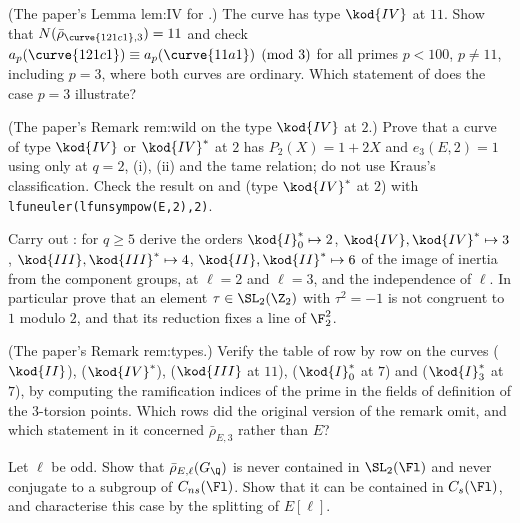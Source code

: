 \begin{exercise}\label{ex:galrep:121c1}
(The paper's Lemma lem:IV for .) The curve  has type $\kod{IV}$ at $11$. Show that $N(\bar\rho_{\curve{121c1},3})=11$ and check
$a_p(\curve{121c1})\equiv a_p(\curve{11a1})\pmod3$ for all primes $p<100$, $p\ne11$, including $p=3$, where both curves are ordinary. Which statement of
 does the case $p=3$ illustrate?
\end{exercise}

\begin{exercise}\label{ex:galrep:IV-at-2}
(The paper's Remark rem:wild on the type $\kod{IV}$ at $2$.) Prove that a curve of type $\kod{IV}$ or $\kod{IV}^*$ at $2$ has $P_2(X)=1+2X$ and $e_3(E,2)=1$ using only
 at $q=2$, (i), (ii) and the tame relation; do not use Kraus's classification. Check the
result on  and  (type $\kod{IV}^*$ at $2$) with \texttt{lfuneuler(lfunsympow(E,2),2)}.
\end{exercise}

\begin{exercise}\label{ex:galrep:kraus}
Carry out : for $q\ge5$ derive the orders $\kod{I}_0^*\mapsto2$, $\kod{IV},\kod{IV}^*\mapsto3$, $\kod{III},\kod{III}^*\mapsto4$, $\kod{II},\kod{II}^*\mapsto6$
of the image of inertia from the component groups,  at $\ell=2$ and $\ell=3$, and the independence of $\ell$. In particular
prove that an element $\tau\in\SL_2(\Z_2)$ with $\tau^2=-1$ is not congruent to $1$ modulo $2$, and that its reduction fixes a line of $\F_2^2$.
\end{exercise}

\begin{exercise}\label{ex:galrep:types-rows}
(The paper's Remark rem:types.) Verify the table of  row by row on the curves  ($\kod{II}$),  ($\kod{IV}^*$),
 ($\kod{III}$ at $11$),  ($\kod{I}_0^*$ at $7$) and  ($\kod{I}_3^*$ at $7$), by computing the ramification indices of the prime in the fields of
definition of the $3$-torsion points. Which rows did the original version of the remark omit, and which statement in it concerned $\bar\rho_{E,3}$ rather
than $E$?
\end{exercise}

\begin{exercise}\label{ex:galrep:cns}
Let $\ell$ be odd. Show that $\bar\rho_{E,\ell}(G_\Q)$ is never contained in $\SL_2(\Fl)$ and never conjugate to a subgroup of $C_{ns}(\Fl)$. Show that it can be contained in
$C_s(\Fl)$, and characterise this case by the splitting of $E[\ell]$.
\end{exercise}

